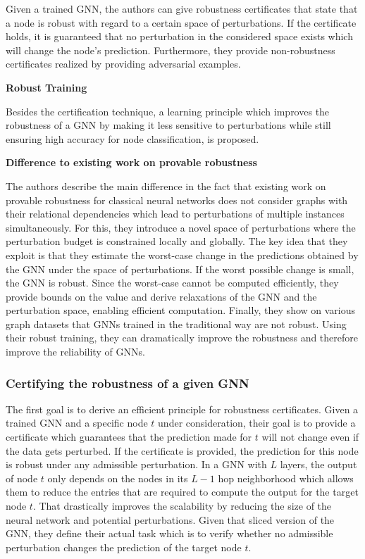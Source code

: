\documentclass[a4paper,preprint]{sig-alternate}
\begin{document}
Given a trained GNN, the authors can give robustness certificates that state that a
node is robust with regard to a certain space of perturbations. If the certificate
holds, it is guaranteed that no perturbation in the considered space exists
which will change the node's prediction. Furthermore, they provide non-robustness
certificates realized by providing adversarial examples.\newline

\textbf{Robust Training}\newline

Besides the certification technique, a learning principle which improves the robustness of a GNN
by making it less sensitive to perturbations while still ensuring high accuracy for node classification, is proposed.\newline

\textbf{Difference to existing work on provable robustness}\newline

The authors describe the main difference in the fact that existing work on provable robustness for classical neural networks
does not consider graphs with their relational dependencies which lead to perturbations of multiple instances simultaneously.
For this, they introduce a novel space of perturbations where the perturbation budget is constrained locally and globally.
The key idea that they exploit is that they estimate the worst-case change in the predictions obtained by the GNN under
the space of perturbations. If the worst possible change is small, the GNN is robust. Since the worst-case cannot be computed
efficiently, they provide bounds on the value and derive relaxations of the GNN and the perturbation space, 
enabling efficient computation. Finally, they show on various graph datasets that GNNs trained in the traditional way are not robust. 
Using their robust training, they can dramatically improve the robustness and therefore improve the reliability of GNNs.

\vfill
\pagebreak

\subsubsection{Certifying the robustness of a given GNN}

The first goal is to derive an efficient principle for robustness certificates. Given a trained GNN and a specific node $t$ under consideration,
their goal is to provide a certificate which guarantees that the prediction made for $t$ will not change even if the data gets perturbed.
If the certificate is provided, the prediction for this node is robust under any admissible perturbation.\newline
In a GNN with $L$ layers, the output of node $t$ only depends on the nodes in its $L-1$ hop neighborhood
which allows them to reduce the entries that are required to compute the output for the target node $t$. That drastically improves the scalability
by reducing the size of the neural network and potential perturbations. Given that sliced version of the GNN, they define their actual
task which is to verify whether no admissible perturbation changes the prediction of the target node $t$.\newline
\end{document}
